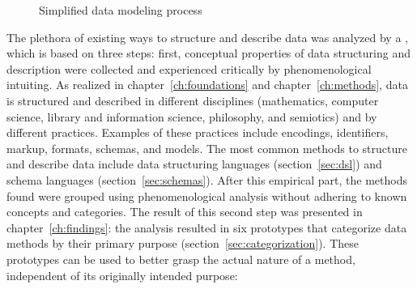 \begin{figure}[b]
\centering
{}
\caption{Simplified data modeling process}
\label{fig:simplifieddatamodeling}
\end{figure}

The plethora of existing ways to structure and describe data was analyzed by a
, which is based on three steps: first,
conceptual properties of data structuring and description were collected and
experienced critically by phenomenological intuiting. As realized in
chapter~\ref{ch:foundations} and chapter~\ref{ch:methods}, data is structured
and described in different disciplines (mathematics, computer science, library
and information science, philosophy, and semiotics) and by different practices.
Examples of these practices include encodings, identifiers, markup, formats,
schemas, and models. The most common methods to structure and describe data
include data structuring languages (section~\ref{sec:dsl}) and schema languages
(section~\ref{sec:schemas}).  After this empirical part, the methods found were
grouped using phenomenological analysis without adhering to known concepts and
categories. The result of this second step was presented in
chapter~\ref{ch:findings}: the analysis resulted in six prototypes that
categorize data methods by their primary purpose
(section~\ref{sec:categorization}).  These prototypes can be used to better
grasp the actual nature of a method, independent of its originally intended
purpose:

